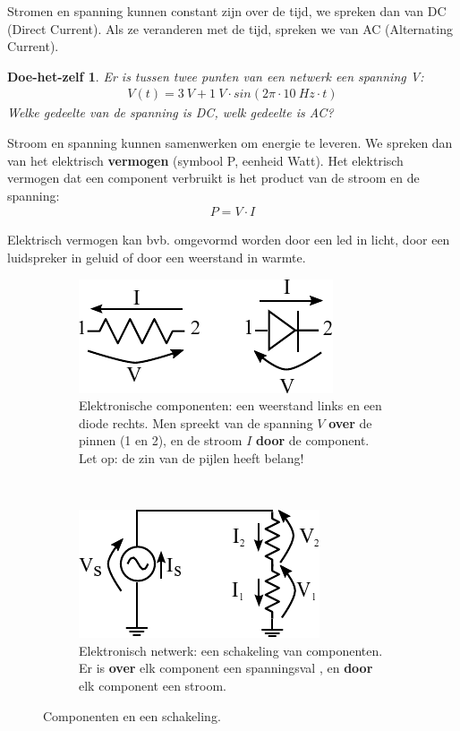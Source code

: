 \documentclass{article}
\newtheorem{DIY}{Doe-het-zelf}
\begin{document}
		Stromen en spanning kunnen constant zijn over de tijd, we spreken dan van DC (Direct Current). Als ze veranderen met de tijd, spreken we van AC (Alternating Current).

		\begin{DIY}
			Er is tussen twee punten van een netwerk een spanning V:
			\begin{align*}
			    V(t)  = 3~V + 1~V \cdot sin(2\pi \cdot 10~Hz \cdot t)
			\end{align*}
			Welke gedeelte van de spanning is DC, welk gedeelte is AC?
		\end{DIY}

		Stroom en spanning kunnen samenwerken om energie te leveren. We spreken dan van het elektrisch \textbf{vermogen} (symbool P, eenheid Watt). Het elektrisch vermogen dat een component verbruikt is het product van de stroom en de spanning:
		\begin{align}
		     P = V \cdot I
		     \label{eq:vermogen}
		 \end{align} 

		Elektrisch vermogen kan bvb. omgevormd worden door een led in licht, door een luidspreker in geluid of door een weerstand in warmte.

		\begin{figure}[hbtp]
			\centering
			\begin{subfigure}[b]{0.4\linewidth}
				\centering
				\includegraphics{componenten}
				\caption{Elektronische componenten: een weerstand links en een diode rechts. Men spreekt van de spanning $V$ \textbf{over} de pinnen (1 en 2), en de stroom $I$ \textbf{door} de component. Let op: de zin van de pijlen heeft belang!}
				\label{subfig:componenten}
			\end{subfigure}
			~
			\begin{subfigure}[b]{0.4\linewidth}
				\centering
				\includegraphics{weerstandsdeler}
				\caption{Elektronisch netwerk: een schakeling van componenten. Er is \textbf{over} elk component een spanningsval , en \textbf{door} elk component een stroom.}
				\label{subfig:netwerk}
			\end{subfigure}
			\caption{Componenten en een schakeling. }
			\label{fig:component_en_schakeling}
		\end{figure}
\end{document}

